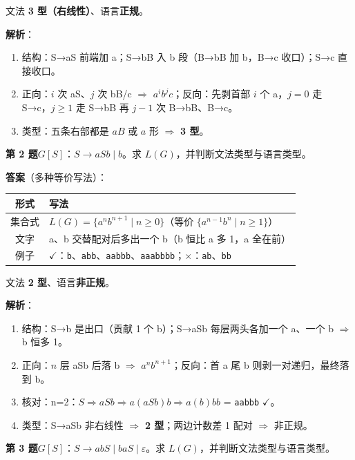 \documentclass[12pt,a4paper,fontset=windows]{ctexart}
\newcommand{\ok}{\ensuremath{\checkmark}}
\newcommand{\bad}{\ensuremath{\times}}
\newcommand{\imp}{\ensuremath{\Rightarrow}}
\begin{document}
文法 \textbf{3 型（右线性）}、语言\textbf{正规}。

\textbf{解析}：
\begin{enumerate}
\item 结构：S→aS 前端加 a；S→bB 入 b 段（B→bB 加 b，B→c 收口）；S→c 直接收口。
\item 正向：$i$ 次 aS、$j$ 次 bB/c \imp{} $a^i b^j c$；反向：先剥首部 $i$ 个 a，$j=0$ 走 S→c，$j\ge 1$ 走 S→bB 再 $j-1$ 次 B→bB、B→c。
\item 类型：五条右部都是 $aB$ 或 $a$ 形 \imp{} \textbf{3 型}。
\end{enumerate}

\begin{qbox}
{\large\bfseries 第 2 题}\quad $G[S]$：$S \to aSb \mid b$。求 $L(G)$，并判断文法类型与语言类型。
\end{qbox}

\textbf{答案}（多种等价写法）：

\begin{center}
\renewcommand{\arraystretch}{1.25}
\begin{tabular}{c p{11.2cm}}
\toprule
\textbf{形式} & \textbf{写法} \\
\midrule
集合式 & $L(G)=\{a^n b^{n+1} \mid n \ge 0\}$（等价 $\{a^{n-1} b^{n} \mid n \ge 1\}$） \\
文字 & a、b 交替配对后多出一个 b（b 恒比 a 多 1，a 全在前） \\
例子 & \ok：\texttt{b}、\texttt{abb}、\texttt{aabbb}、\texttt{aaabbbb}；\bad：\texttt{ab}、\texttt{bb} \\
\bottomrule
\end{tabular}
\end{center}

文法 \textbf{2 型}、语言\textbf{非正规}。

\textbf{解析}：
\begin{enumerate}
\item 结构：S→b 是出口（贡献 1 个 b）；S→aSb 每层两头各加一个 a、一个 b \imp{} b 恒多 1。
\item 正向：$n$ 层 aSb 后落 b \imp{} $a^n b^{n+1}$；反向：首 a 尾 b 则剥一对递归，最终落到 b。
\item 核对：n=2：$S \Rightarrow aSb \Rightarrow a(aSb)b \Rightarrow a(b)bb$ = \texttt{aabbb} \ok。
\item 类型：S→aSb 非右线性 \imp{} \textbf{2 型}；两边计数差 1 配对 \imp{} 非正规。
\end{enumerate}

\begin{qbox}
{\large\bfseries 第 3 题}\quad $G[S]$：$S \to abS \mid baS \mid \varepsilon$。求 $L(G)$，并判断文法类型与语言类型。
\end{qbox}
\end{document}
